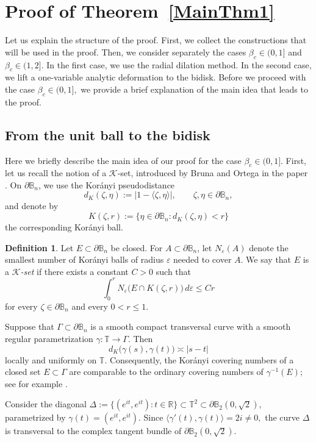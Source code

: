 \documentclass[a4paper,12pt]{amsart}
\theoremstyle{definition}
\newtheorem{defn}[thm]{Definition}
\begin{document}
\section{Proof of Theorem~\ref{MainThm1}} \label{Section3} Let us explain the structure of the proof. First, we collect the constructions that will be used in the proof. Then, we consider separately the cases $\beta_c\in(0,1]$ and
$\beta_c\in(1,2]$. In the first case, we use the radial dilation
method. In the second case, we lift a one-variable analytic deformation
to the bidisk. Before we proceed with the case $\beta_c\in(0,1],$ we provide a brief explanation of the main idea that leads to the proof.

\subsection{From the unit ball to the bidisk} Here we briefly describe the main idea of our proof for the case $\beta_c\in(0,1].$ 
First, let us recall the notion of a $\mathcal K$-set, introduced by Bruna and
Ortega in the paper \cite{Bruna1986}. On $\partial\mathbb B_n$, we use the Kor\'anyi
pseudodistance
\[
    d_K(\zeta,\eta)
    :=\bigl|1-\langle\zeta,\eta\rangle\bigr|,
    \qquad \zeta,\eta\in\partial\mathbb B_n,
\]
and denote by
\[
    K(\zeta,r)
    :=\bigl\{\eta\in\partial\mathbb B_n:
                   d_K(\zeta,\eta)<r\bigr\}
\]
the corresponding Kor\'anyi ball.

\begin{defn}
Let $E\subset\partial\mathbb B_n$ be closed. For
$A\subset\partial\mathbb B_n$, let $N_\varepsilon(A)$ denote the
smallest number of Kor\'anyi balls of radius $\varepsilon$ needed to
cover $A$. We say that $E$ is a \emph{$\mathcal K$-set} if there exists a
constant $C>0$ such that
\[
    \int_0^r N_\varepsilon\bigl(E\cap K(\zeta,r)\bigr)\,d\varepsilon
    \leq Cr
\]
for every $\zeta\in\partial\mathbb B_n$ and every $0<r\leq1$.
\end{defn}

Suppose that $\Gamma\subset\partial\mathbb B_n$ is a smooth compact
transversal curve with a smooth regular parametrization
$\gamma:\mathbb T\to\Gamma$. Then
\[
    d_K\bigl(\gamma(s),\gamma(t)\bigr)\asymp|s-t|
\]
locally and uniformly on $\mathbb T$. Consequently, the Kor\'anyi
covering numbers of a closed set $E\subset\Gamma$ are comparable to the
ordinary covering numbers of $\gamma^{-1}(E)$; see for example
\cite[Lemma~4.1]{Bruna1986}.

Consider the diagonal
$
    \Delta
    :=\bigl\{(e^{it},e^{it}):t\in\mathbb R\bigr\}
    \subset\mathbb T^2
    \subset\partial\mathbb B_2(0,\sqrt2),
$
parametrized by $\gamma(t)=(e^{it},e^{it})$. Since
$
    \bigl\langle\gamma'(t),\gamma(t)\bigr\rangle=2i\neq0,
$
the curve $\Delta$ is transversal to the complex tangent bundle of
$\partial\mathbb B_2(0,\sqrt2)$.
\end{document}
